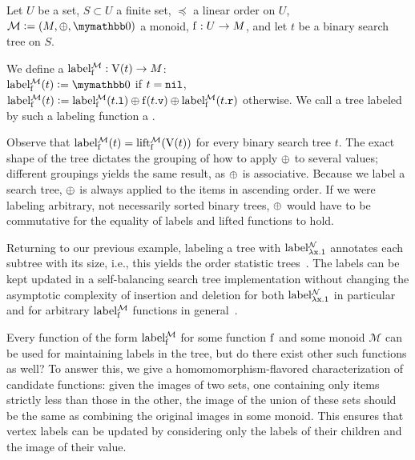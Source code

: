 \documentclass[conference]{IEEEtran}
\begin{document}
\begin{definition}
Let $U$ be a set, $S \subset U$ a finite set, $\preceq$ a linear order on $U$, $\mathcal{M} \defeq (M, \groupaddsym, \neutraladd)$ a monoid, ${\operatorname{f}}: {U} \rightarrow {M}$, and let $t$ be a binary search tree on $S$.

We define a  ${\operatorname{label_{\operatorname{f}}^{\mathcal{M}}}}: {\operatorname{V}(t)} \rightarrow {M}$:\\
$\liftlabel{\f}{\mathcal{M}}(t) \defeq \neutraladd$ if $t = \mathtt{nil}$,\\
$\operatorname{label_{\operatorname{f}}^{\mathcal{M}}}(t) \vcentcolon= {\operatorname{label_{\operatorname{f}}^{\mathcal{M}}}({t}\mathtt{.l})} \oplus {{\operatorname{f}({t}\mathtt{.v})} \oplus{\operatorname{label_{\operatorname{f}}^{\mathcal{M}}}({t}\mathtt{.r})}}$ otherwise.
We call a tree labeled by such a labeling function a .
\end{definition}

Observe that $\operatorname{label_{\operatorname{f}}^{\mathcal{M}}}(t) = \operatorname{lift_{\operatorname{f}}^{\mathcal{M}}}(\operatorname{V}(t))$ for every binary search tree $t$. The exact shape of the tree dictates the grouping of how to apply $\oplus$ to several values; different groupings yields the same result, as $\oplus$ is associative. Because we label a search tree, $\oplus$ is always applied to the items in ascending order. If we were labeling arbitrary, not necessarily sorted binary trees, $\oplus$ would have to be commutative for the equality of labels and lifted functions to hold.

Returning to our previous example, labeling a tree with $\operatorname{label_{\lambda x.1}^{\mathcal{N}}}$ annotates each subtree with its size, i.e., this yields the order statistic trees~\cite{cormen2022introduction}. The labels can be kept updated in a self-balancing search tree implementation without changing the asymptotic complexity of insertion and deletion for both $\operatorname{label_{\lambda x.1}^{\mathcal{N}}}$ in particular and for arbitrary $\operatorname{label_{\operatorname{f}}^{\mathcal{M}}}$ functions in general~\cite{cormen2022introduction}.

Every function of the form $\operatorname{label_{\operatorname{f}}^{\mathcal{M}}}$ for some function $\operatorname{f}$ and some monoid $\mathcal{M}$ can be used for maintaining labels in the tree, but do there exist other such functions as well? To answer this, we give a homomomorphism-flavored characterization of candidate functions: given the images of two sets, one containing only items strictly less than those in the other, the image of the union of these sets should be the same as combining the original images in some monoid. This ensures that vertex labels can be updated by considering only the labels of their children and the image of their value.
\end{document}
